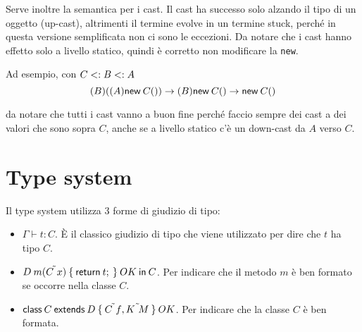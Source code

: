 \begin{prooftree}
\end{prooftree}

\begin{prooftree}
\end{prooftree}

\noindent Serve inoltre la semantica per i cast. Il cast ha successo solo alzando il tipo di un oggetto (up-cast), altrimenti il termine evolve in un termine stuck, perché in questa versione semplificata non ci sono le eccezioni. Da notare che i cast hanno effetto solo a livello statico, quindi è corretto non modificare la \texttt{new}.

\begin{center}
\begin{bprooftree}
\end{bprooftree}
\begin{bprooftree}
\end{bprooftree}
\end{center}

\noindent Ad esempio, con $C \stype B \stype A$
$$
(B)((A) \new{C}{}) \to (B) \new{C}{} \to \new{C}{}
$$

\noindent da notare che tutti i cast vanno a buon fine perché faccio sempre dei cast a dei valori che sono sopra $C$, anche se a livello statico c'è un down-cast da $A$ verso $C$.

\section{Type system}

Il type system utilizza 3 forme di giudizio di tipo:

\begin{itemize}
	\item $\Gamma \vdash t : C$. \`E il classico giudizio di tipo che viene utilizzato per dire che $t$ ha tipo $C$.
	\item $\method{D}{m}{\tilde{C\ x}}{t} \: OK \: \IN{C}$. Per indicare che il metodo $m$ è ben formato se occorre nella classe $C$.
	\item $ \class{C}{D}{\tilde{C\ f}, \tilde{K \ M}} \: OK$. Per indicare che la classe $C$ è ben formata.
\end{itemize}

